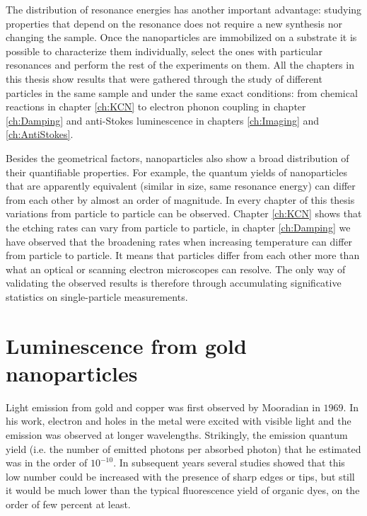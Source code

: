 The distribution of resonance energies has another important advantage: studying
properties that depend on the resonance does not require a new synthesis nor
changing the sample. Once the nanoparticles are immobilized on a substrate it is
possible to characterize them individually, select the ones with particular
resonances and perform the rest of the experiments on them. All the chapters in
this thesis show results that were gathered through the study of different
particles in the same sample and under the same exact conditions: from chemical
reactions in chapter \ref{ch:KCN} to electron phonon coupling in chapter
\ref{ch:Damping} and anti-Stokes luminescence in chapters \ref{ch:Imaging} and
\ref{ch:AntiStokes}.

Besides the geometrical factors, nanoparticles also show a broad distribution of
their quantifiable properties. For example, the quantum yields of nanoparticles
that are apparently equivalent (similar in size, same resonance energy) can
differ from each other by almost an order of magnitude\cite{Yorulmaz2012}. In
every chapter of this thesis variations from particle to particle can be
observed. Chapter \ref{ch:KCN} shows that the etching rates can vary from
particle to particle, in chapter \ref{ch:Damping} we have observed that the
broadening rates when increasing temperature can differ from particle to
particle. It means that particles differ from each other more than what an
optical or scanning electron microscopes can resolve. The only way of validating
the observed results is therefore through accumulating significative statistics
on single-particle measurements.

\section{Luminescence from gold nanoparticles}
\label{sec:luminescence}
Light emission from gold and copper was first observed by
Mooradian\cite{Mooradian1969} in $1969$. In his work, electron and holes in the
metal were excited with visible light and the emission was observed at longer
wavelengths. Strikingly, the emission quantum yield (i.e. the number of emitted
photons per absorbed photon) that he estimated was in the order of $10^{-10}$.
In subsequent years several studies showed that this low number could be
increased with the presence of sharp edges\cite{boyd1986photoinduced} or
tips\cite{Mohamed2000}, but still it would be much lower than the typical
fluorescence yield of organic dyes, on the order of few percent at least.

